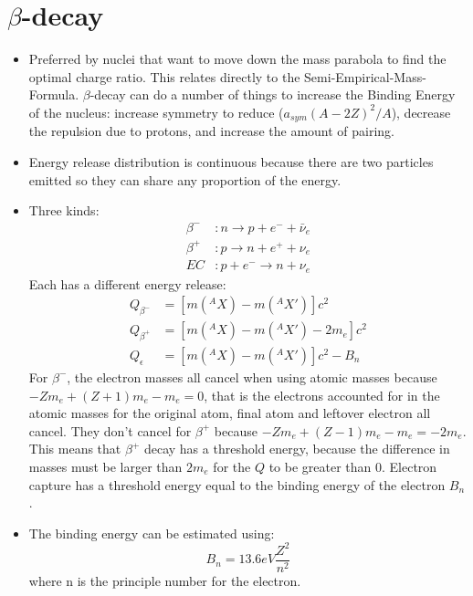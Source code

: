 \documentclass[letter]{article}
\begin{document}
\section{$\beta$-decay}
\begin{itemize}
\item Preferred by nuclei that want to move down the mass parabola to
  find the optimal charge ratio. This relates directly to the
  Semi-Empirical-Mass-Formula. $\beta$-decay can do a number of things
  to increase the Binding Energy of the nucleus: increase symmetry to
  reduce ($a_{sym}(A-2Z)^2/A$), decrease the repulsion due to
  protons, and increase the amount of pairing.
\item Energy release distribution is continuous because there are two
  particles emitted so they can share any proportion of the
  energy.~\cite[pp. 273, Lec 19]{krane,lecture}
\item Three kinds:
  \begin{equation*}
    \begin{split}
    \beta^-&: n \to p + e^- + \bar{\nu}_e \\
    \beta^+&: p \to n + e^+ + \nu_e \\
    EC&: p + e^- \to n + \nu_e
  \end{split}
  \end{equation*}
Each has a different energy release:
\begin{equation*}
  \begin{split}
    Q_{\beta^-}&=[m(^AX)-m(^AX')]c^2 \\
    Q_{\beta^+}&=[m(^AX)-m(^AX')-2m_e]c^2\\
    Q_{\epsilon}&=[m(^AX)-m(^AX')]c^2-B_n
  \end{split}
\end{equation*}
For $\beta^-$, the electron masses all cancel when using atomic masses
because $-Zm_e+(Z+1)m_e-m_e=0$, that is the electrons accounted for in
the atomic masses for the original atom, final atom and leftover
electron all cancel. They don't cancel for $\beta^+$ because
$-Zm_e+(Z-1)m_e-m_e=-2m_e$. This means that $\beta^+$ decay has a
threshold energy, because the difference in masses must be larger than
$2m_e$ for the $Q$ to be greater than 0. Electron capture has a
threshold energy equal to the binding energy of the electron $B_n$.~\cite[pp. 274-276]{krane}
\item The binding energy can be estimated using:
  \begin{equation*}
    B_n=13.6 eV\frac{Z^2}{n^2}
  \end{equation*}
where n is the principle number for the electron.
\end{itemize}
\end{document}
